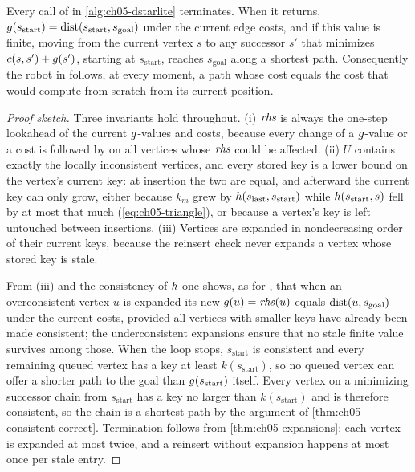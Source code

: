 \begin{theorem}
\label{thm:ch05-correct}
Every call of \DslComputeShortestPath in \cref{alg:ch05-dstarlite} terminates. When it
returns, $g(s_{\mathrm{start}}) = \operatorname{dist}(s_{\mathrm{start}}, s_{\mathrm{goal}})$
under the current edge costs, and if this value is finite, moving from the current
vertex $s$ to any successor $s'$ that minimizes $c(s,s') + g(s')$, starting at
$s_{\mathrm{start}}$, reaches $s_{\mathrm{goal}}$ along a shortest path. Consequently
the robot in \DslMain follows, at every moment, a path whose cost equals the cost that
\astar would compute from scratch from its current position.
\end{theorem}
\begin{proof}[Proof sketch]
Three invariants hold throughout. (i) $\mathit{rhs}$ is always the one-step lookahead of the
current $g$-values and costs, because every change of a $g$-value or a cost is
followed by \DslUpdateVertex on all vertices whose $\mathit{rhs}$ could be affected. (ii) $U$
contains exactly the locally inconsistent vertices, and every stored key is a lower
bound on the vertex's current key: at insertion the two are equal, and afterward the
current key can only grow, either because $k_m$ grew by $h(s_{\mathrm{last}}, s_{\mathrm{start}})$
while $h(s_{\mathrm{start}},s)$ fell by at most that much (\cref{eq:ch05-triangle}),
or because a vertex's key is left untouched between insertions. (iii) Vertices are
expanded in nondecreasing order of their current keys, because the reinsert check
never expands a vertex whose stored key is stale.

From (iii) and the consistency of $h$ one shows, as for \astar, that when an
overconsistent vertex $u$ is expanded its new $g(u)=\mathit{rhs}(u)$ equals
$\operatorname{dist}(u, s_{\mathrm{goal}})$ under the current costs, provided all vertices with
smaller keys have already been made consistent; the underconsistent expansions ensure
that no stale finite value survives among those. When the loop stops, $s_{\mathrm{start}}$
is consistent and every remaining queued vertex has a key at least
$k(s_{\mathrm{start}})$, so no queued vertex can offer a shorter path to the goal than
$g(s_{\mathrm{start}})$ itself. Every vertex on a minimizing successor chain from
$s_{\mathrm{start}}$ has a key no larger than $k(s_{\mathrm{start}})$ and is therefore
consistent, so the chain is a shortest path by the argument of
\cref{thm:ch05-consistent-correct}. Termination follows from
\cref{thm:ch05-expansions}: each vertex is expanded at most twice, and a reinsert
without expansion happens at most once per stale entry.
\end{proof}


